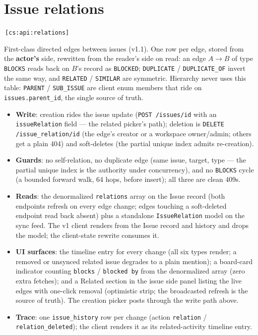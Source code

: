 \documentclass[11pt,a4paper]{report}
\newcommand{\cs}[1]{\,\texttt{\scriptsize[cs:#1]}\label{cs:#1}}
\begin{document}
\section{Issue relations}
\label{sec:relations}
\cs{api:relations}

First-class directed edges between issues (v1.1). One row per edge,
stored from the \textbf{actor's} side, rewritten from the reader's side
on read: an edge $A \rightarrow B$ of type \texttt{BLOCKS} reads back on $B$'s
record as \texttt{BLOCKED}; \texttt{DUPLICATE} / \texttt{DUPLICATE\_OF} invert the
same way, and \texttt{RELATED} / \texttt{SIMILAR} are symmetric. Hierarchy never
uses this table: \texttt{PARENT} / \texttt{SUB\_ISSUE} are client enum members
that ride on \texttt{issues.parent\_id}, the single source of truth.

\begin{itemize}
\item \textbf{Write}: creation rides the issue update (\texttt{POST /issues/{id}}
  with an \texttt{issueRelation} field --- the related picker's path); deletion
  is \texttt{DELETE /issue\_relation/{id}} (the edge's creator or a workspace
  owner/admin; others get a plain 404) and soft-deletes (the partial unique
  index admits re-creation).
\item \textbf{Guards}: no self-relation, no duplicate edge (same issue, target,
  type --- the partial unique index is the authority under concurrency), and
  no \texttt{BLOCKS} cycle (a bounded forward walk, 64 hops, before insert);
  all three are clean 409s.
\item \textbf{Reads}: the denormalized \texttt{relations} array on the Issue record
  (both endpoints refresh on every edge change; edges touching a
  soft-deleted endpoint read back absent) plus a standalone
  \texttt{IssueRelation} model on the sync feed. The v1 client renders from
  the Issue record and history and drops the model; the client-state
  rewrite consumes it.
\item \textbf{UI surfaces}: the timeline entry for every change (all six types
  render; a removed or unsynced related issue degrades to a plain
  mention); a board-card indicator counting \texttt{blocks} / \texttt{blocked by}
  from the denormalized array (zero extra fetches); and a Related section
  in the issue side panel listing the live edges with one-click removal
  (optimistic strip; the broadcasted refresh is the source of truth). The
  creation picker posts through the write path above.
\item \textbf{Trace}: one \texttt{issue\_history} row per change (action
  \texttt{relation} / \texttt{relation\_deleted}); the client renders it as its
  related-activity timeline entry.
\end{itemize}
\end{document}

